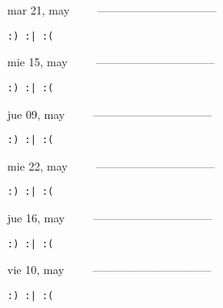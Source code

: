 \documentclass[letterpaper,10pt]{article}
\begin{document}
\begin{multicols}{3}
{mar 21, may\ \ \ \ \ --------------------------------}
\begin{flushright}\begin{small}\texttt{:) :| :(}\end{small}\end{flushright}
\vfill
{mie 15, may\ \ \ \ \ --------------------------------}
\begin{flushright}\begin{small}\texttt{:) :| :(}\end{small}\end{flushright}\par
\vfill
{jue 09, may\ \ \ \ \ --------------------------------}
\begin{flushright}\begin{small}\texttt{:) :| :(}\end{small}\end{flushright}\par
\vfill
\end{multicols}
\vspace{1.05cm}

\begin{multicols}{3}
{mie 22, may\ \ \ \ \ --------------------------------}
\begin{flushright}\begin{small}\texttt{:) :| :(}\end{small}\end{flushright}
\vfill
{jue 16, may\ \ \ \ \ --------------------------------}
\begin{flushright}\begin{small}\texttt{:) :| :(}\end{small}\end{flushright}\par
\vfill
{vie 10, may\ \ \ \ \ --------------------------------}
\begin{flushright}\begin{small}\texttt{:) :| :(}\end{small}\end{flushright}\par
\vfill
\end{multicols}
\vspace{1.05cm}
\end{document}
